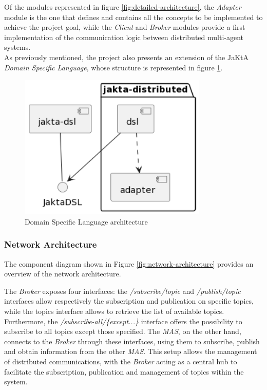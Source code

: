 Of the modules represented in figure \ref{fig:detailed-architecture}, the \textit{Adapter} module is the one that defines and contains all the concepts to be implemented to achieve the project goal,
while the \textit{Client} and \textit{Broker} modules provide a first implementation of the communication logic between distributed multi-agent systems.\\

As previously mentioned, the project also presents an extension of the JaKtA \textit{Domain Specific Language}, whose structure is represented in figure \ref{fig:dsl-architecture}.

\begin{figure}[ht!]
    \centering
    \includegraphics[width=0.8\textwidth]{figures/dsl-architecture.png}
    \caption{Domain Specific Language architecture}
    \label{fig:dsl-architecture}
\end{figure}

\subsubsection{Network Architecture}
The component diagram shown in Figure \ref{fig:network-architecture} provides an overview of the network architecture.

The \textit{Broker} exposes four interfaces: the \textit{/subscribe/{topic}} and \textit{/publish/{topic}} interfaces allow respectively the subscription and publication on specific topics, while the topics interface allows to retrieve the list of available topics. Furthermore, the \textit{/subscribe-all/\{except...\}} interface offers the possibility to subscribe to all topics except those specified. The \textit{MAS}, on the other hand, connects to the \textit{Broker} through these interfaces, using them to subscribe, publish and obtain information from the other \textit{MAS}. This setup allows the management of distributed communications, with the \textit{Broker} acting as a central hub to facilitate the subscription, publication and management of topics within the system.

